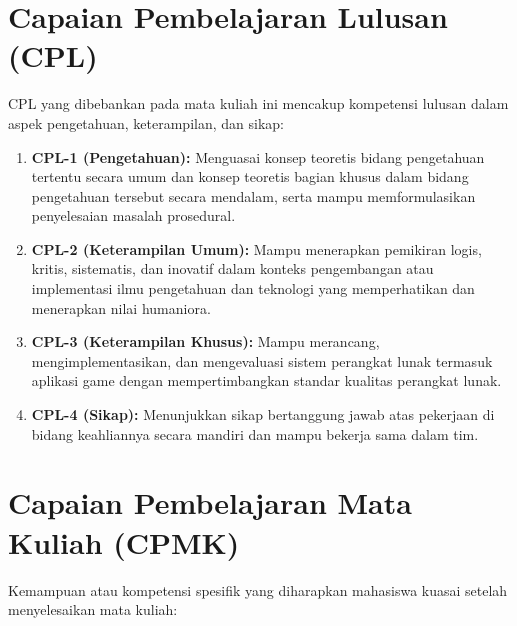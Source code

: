 \vspace{1cm}

\section*{Capaian Pembelajaran Lulusan (CPL)}

CPL yang dibebankan pada mata kuliah ini mencakup kompetensi lulusan dalam aspek pengetahuan, keterampilan, dan sikap:

\begin{enumerate}
  \item \textbf{CPL-1 (Pengetahuan):} Menguasai konsep teoretis bidang pengetahuan tertentu secara umum dan konsep teoretis bagian khusus dalam bidang pengetahuan tersebut secara mendalam, serta mampu memformulasikan penyelesaian masalah prosedural.
  
  \item \textbf{CPL-2 (Keterampilan Umum):} Mampu menerapkan pemikiran logis, kritis, sistematis, dan inovatif dalam konteks pengembangan atau implementasi ilmu pengetahuan dan teknologi yang memperhatikan dan menerapkan nilai humaniora.
  
  \item \textbf{CPL-3 (Keterampilan Khusus):} Mampu merancang, mengimplementasikan, dan mengevaluasi sistem perangkat lunak termasuk aplikasi game dengan mempertimbangkan standar kualitas perangkat lunak.
  
  \item \textbf{CPL-4 (Sikap):} Menunjukkan sikap bertanggung jawab atas pekerjaan di bidang keahliannya secara mandiri dan mampu bekerja sama dalam tim.
\end{enumerate}

\section*{Capaian Pembelajaran Mata Kuliah (CPMK)}

Kemampuan atau kompetensi spesifik yang diharapkan mahasiswa kuasai setelah menyelesaikan mata kuliah:

